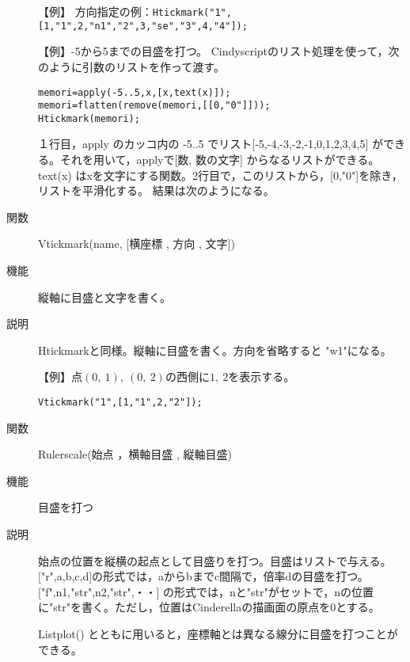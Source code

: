 \documentclass[papersize,a4paper,10pt,uplatex]{jsarticle}
\begin{document}
\begin{description}
\vspace{\baselineskip}
【例】 方向指定の例：\verb|Htickmark("1",[1,"1",2,"n1","2",3,"se","3",4,"4"]);|

\vspace{\baselineskip}
\begin{center}

\end{center}

【例】-5から5までの目盛を打つ。
Cindyscriptのリスト処理を使って，次のように引数のリストを作って渡す。
\begin{verbatim}
memori=apply(-5..5,x,[x,text(x)]);
memori=flatten(remove(memori,[[0,"0"]]));
Htickmark(memori);
\end{verbatim}
１行目，apply のカッコ内の -5..5 でリスト[-5,-4,-3,-2,-1,0,1,2,3,4,5] ができる。それを用いて，applyで[数, 数の文字] からなるリストができる。text(x) はxを文字にする関数。2行目で，このリストから，[0,"0"]を除き，リストを平滑化する。 結果は次のようになる。

\begin{center} \scalebox{0.8}{}\end{center}

\hypertarget{vtickmark}{}
\item[関数]Vtickmark(name, [横座標 , 方向 , 文字])
\item[機能]縦軸に目盛と文字を書く。
\item[説明]Htickmarkと同様。縦軸に目盛を書く。方向を省略すると "w1"になる。

\vspace{\baselineskip}
【例】点$(0,\ 1),\ (0,\ 2)$の西側に$1,\ 2$を表示する。

\hspace{10mm}\verb|Vtickmark("1",[1,"1",2,"2"]);|

\vspace{\baselineskip}
\hypertarget{rulerscale}{}
\item[関数]Rulerscale(始点 ，横軸目盛 , 縦軸目盛)
\item[機能]目盛を打つ
\item[説明]始点の位置を縦横の起点として目盛りを打つ。目盛はリストで与える。
["r",a,b,c,d]の形式では，aからbまでc間隔で，倍率dの目盛を打つ。
["f",n1,"str",n2,"str",・・] の形式では，nと"str"がセットで，nの位置に"str"を書く。ただし，位置はCinderellaの描画面の原点を0とする。

Listplot() とともに用いると，座標軸とは異なる線分に目盛を打つことができる。


\end{description}
\end{document}
